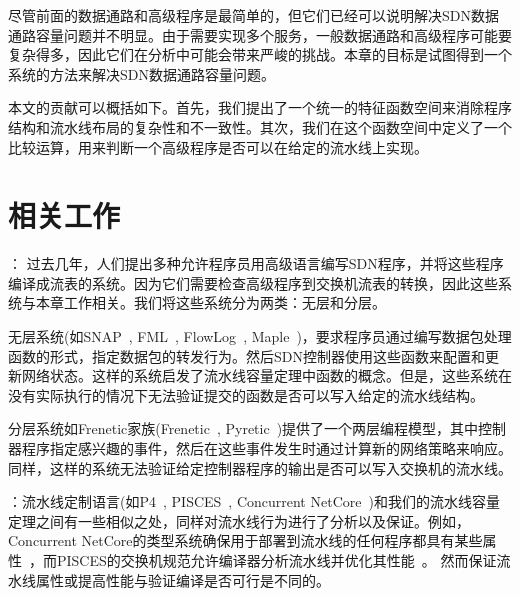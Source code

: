 \documentclass{ctexart}
\newcommand{\para}[1]{\smallskip\noindent {\bf #1}}
\begin{document}
尽管前面的数据通路和高级程序是最简单的，但它们已经可以说明解决SDN数据通路容量问题并不明显。由于需要实现多个服务，一般数据通路和高级程序可能要复杂得多，因此它们在分析中可能会带来严峻的挑战。本章的目标是试图得到一个系统的方法来解决SDN数据通路容量问题。

本文的贡献可以概括如下。首先，我们提出了一个统一的特征函数空间来消除程序结构和流水线布局的复杂性和不一致性。其次，我们在这个函数空间中定义了一个比较运算，用来判断一个高级程序是否可以在给定的流水线上实现。



\section{相关工作}\label{sec:related-work}
\para{高级SDN程序编译器}： 过去几年，人们提出多种允许程序员用高级语言编写SDN程序，并将这些程序编译成流表的系统。因为它们需要检查高级程序到交换机流表的转换，因此这些系统与本章工作相关。我们将这些系统分为两类：无层和分层。

无层系统(如SNAP~\cite{arashloo2016snap}, FML~\cite{hinrichs2009practical}, FlowLog~\cite{flowlog},  Maple~\cite{maple})，要求程序员通过编写数据包处理函数的形式，指定数据包的转发行为。然后SDN控制器使用这些函数来配置和更新网络状态。这样的系统启发了流水线容量定理中函数的概念。但是，这些系统在没有实际执行的情况下无法验证提交的函数是否可以写入给定的流水线结构。

分层系统如Frenetic家族(Frenetic~\cite{foster2011frenetic}, Pyretic~\cite{reich2013modular})提供了一个两层编程模型，其中控制器程序指定感兴趣的事件，然后在这些事件发生时通过计算新的网络策略来响应。同样，这样的系统无法验证给定控制器程序的输出是否可以写入交换机的流水线。

\para{流水线定制语言}：流水线定制语言(如P4~\cite{P4}, PISCES~\cite{shahbaz2016pisces}, Concurrent NetCore~\cite{schlesinger2014concurrent})和我们的流水线容量定理之间有一些相似之处，同样对流水线行为进行了分析以及保证。例如，Concurrent NetCore的类型系统确保用于部署到流水线的任何程序都具有某些属性~\cite{schlesinger2014concurrent}，而PISCES的交换机规范允许编译器分析流水线并优化其性能~\cite{shahbaz2016pisces}。
然而保证流水线属性或提高性能与验证编译是否可行是不同的。


\end{document}

